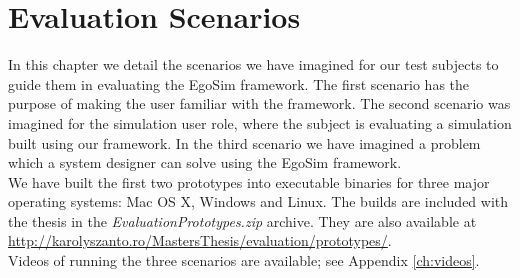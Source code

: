 \chapter{Evaluation Scenarios}\label{ch:evaluation_scenarios}
In this chapter we detail the scenarios we have imagined for our test subjects to guide them in evaluating the EgoSim framework. The first scenario has the purpose of making the user familiar with the framework. The second scenario was imagined for the simulation user role, where the subject is evaluating a simulation built using our framework. In the third scenario we have imagined a problem which a system designer can solve using the EgoSim framework.\\

We have built the first two prototypes into executable binaries for three major operating systems: Mac OS X, Windows and Linux. The builds are included with the thesis in the \emph{EvaluationPrototypes.zip} archive. They are also available at \url{http://karolyszanto.ro/MastersThesis/evaluation/prototypes/}.\\

Videos of running the three scenarios are available; see Appendix \ref{ch:videos}.\\



